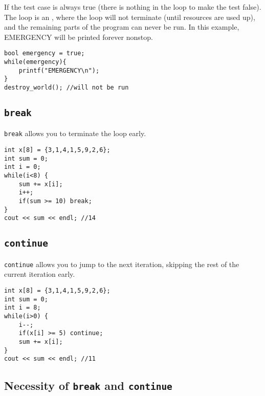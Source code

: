 If the test case is always true (there is nothing in the loop to make the test false). The loop is an , where the loop will not terminate (until resources are used up), and the remaining parts of the program can never be run. In this example, EMERGENCY will be printed forever nonstop.

\begin{lstlisting}
bool emergency = true;
while(emergency){
    printf("EMERGENCY\n");
}
destroy_world(); //will not be run
\end{lstlisting}
\vspace{6mm}

\subsection{\texttt{break}}

\texttt{break} allows you to terminate the loop early.

\begin{lstlisting}
int x[8] = {3,1,4,1,5,9,2,6};
int sum = 0;
int i = 0;
while(i<8) { 
    sum += x[i];
    i++;
    if(sum >= 10) break;
}
cout << sum << endl; //14
\end{lstlisting}

\subsection{\texttt{continue}}

\texttt{continue} allows you to jump to the next iteration, skipping the rest of the current iteration early.

\begin{lstlisting}
int x[8] = {3,1,4,1,5,9,2,6};
int sum = 0;
int i = 8;
while(i>0) {
    i--;
    if(x[i] >= 5) continue;
    sum += x[i];
}
cout << sum << endl; //11
\end{lstlisting}

\subsection{Necessity of \texttt{break} and \texttt{continue}}



